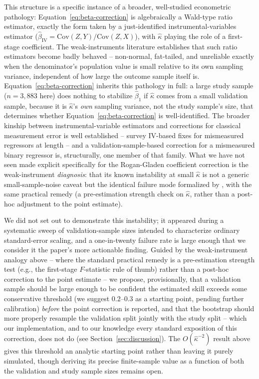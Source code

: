 \documentclass[12pt]{article}
\begin{document}
This structure is a specific instance of a broader, well-studied econometric pathology: Equation~\ref{eq:beta-correction} is algebraically a Wald-type ratio estimator, exactly the form taken by a just-identified instrumental-variables estimator ($\hat\beta_{\text{IV}} = \mathrm{Cov}(Z,Y)/\mathrm{Cov}(Z,X)$), with $\hat\kappa$ playing the role of a first-stage coefficient. The weak-instruments literature \citep{staiger1997instrumental} establishes that such ratio estimators become badly behaved -- non-normal, fat-tailed, and unreliable exactly when the denominator's population value is small relative to its own sampling variance, independent of how large the outcome sample itself is. Equation~\ref{eq:beta-correction} inherits this pathology in full: a large study sample ($n=3{,}883$ here) does nothing to stabilize $\hat\beta_1$ if $\hat\kappa$ comes from a small validation sample, because it is $\hat\kappa$'s \emph{own} sampling variance, not the study sample's size, that determines whether Equation~\ref{eq:beta-correction} is well-identified. The broader kinship between instrumental-variable estimators and corrections for classical measurement error is well established -- \citet{bound2001measurement} survey IV-based fixes for mismeasured regressors at length -- and a validation-sample-based correction for a mismeasured binary regressor is, structurally, one member of that family. What we have not seen made explicit specifically for the Rogan-Gladen coefficient correction is the weak-instrument \emph{diagnosis}: that its known instability at small $\hat\kappa$ is not a generic small-sample-noise caveat but the identical failure mode formalized by \citet{staiger1997instrumental}, with the same practical remedy (a pre-estimation strength check on $\hat\kappa$, rather than a post-hoc adjustment to the point estimate).

We did not set out to demonstrate this instability; it appeared during a systematic sweep of validation-sample sizes intended to characterize ordinary standard-error scaling, and a one-in-twenty failure rate is large enough that we consider it the paper's more actionable finding. Guided by the weak-instrument analogy above -- where the standard practical remedy is a pre-estimation strength test (e.g., the first-stage $F$-statistic rule of thumb) rather than a post-hoc correction to the point estimate -- we propose, provisionally, that a validation sample should be large enough to be confident the estimated skill exceeds some conservative threshold (we suggest $0.2$--$0.3$ as a starting point, pending further calibration) \emph{before} the point correction is reported, and that the bootstrap should more properly resample the validation split jointly with the study split -- which our implementation, and to our knowledge every standard exposition of this correction, does not do (see Section~\ref{sec:discussion}). The $O(\hat\kappa^{-2})$ result above gives this threshold an analytic starting point rather than leaving it purely simulated, though deriving its precise finite-sample value as a function of both the validation and study sample sizes remains open.
\end{document}
